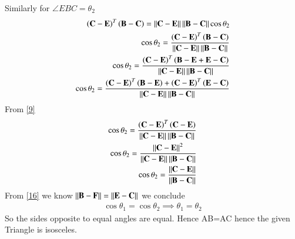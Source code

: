 \documentclass[journal,12pt,twocolumn]{IEEEtran}
\begin{document}
        Similarly for $\angle EBC=\theta_2$
       \begin{align}
        \left(\mathbf{C}-\mathbf{E}\right)^T\left(\mathbf{B}-\mathbf{C}\right)=\left\lVert\mathbf{C}-\mathbf{E}\right\rVert\left\lVert\mathbf{B}-\mathbf{C}\right\rVert\cos\theta_2\\
        \cos{\theta_2}=\frac{\left(\mathbf{C}-\mathbf{E}\right)^T\left(\mathbf{B}-\mathbf{C}\right)}{\left\lVert\mathbf{C}-\mathbf{E}\right\rVert\left\lVert\mathbf{B}-\mathbf{C}\right\rVert}\\
        \cos{\theta_2}=\frac{\left(\mathbf{C}-\mathbf{E}\right)^T\left(\mathbf{B}-\mathbf{E}+\mathbf{E}-\mathbf{C}\right)}{\left\lVert\mathbf{C}-\mathbf{E}\right\rVert\left\lVert\mathbf{B}-\mathbf{C}\right\rVert}\\
        \cos{\theta_2}=\frac{\left(\mathbf{C}-\mathbf{E}\right)^T\left(\mathbf{B}-\mathbf{E}\right) +\left(\mathbf{C}-\mathbf{E}\right)^T\left(\mathbf{E}-\mathbf{C}\right)}{\left\lVert\mathbf{C}-\mathbf{E}\right\rVert\left\lVert\mathbf{B}-\mathbf{C}\right\rVert}
        \end{align}
        From {\eqref{9}}
        \begin{align}
          \cos{\theta_2}=\frac{\left(\mathbf{C}-\mathbf{E}\right)^T\left(\mathbf{C}-\mathbf{E}\right)}{\left\lVert\mathbf{C}-\mathbf{E}\right\rVert\left\lVert\mathbf{B}-\mathbf{C}\right\rVert} \\
          \cos{\theta_2}=\frac{\left\lVert\mathbf{C}-\mathbf{E}\right\rVert^2}{\left\lVert\mathbf{C}-\mathbf{E}\right\rVert\left\lVert\mathbf{B}-\mathbf{C}\right\rVert}\\
          \cos{\theta_2}=\frac{\left\lVert\mathbf{C}-\mathbf{E}\right\rVert}{\left\lVert\mathbf{B}-\mathbf{C}\right\rVert}
        \end{align}
        From \eqref{16} we know $\left\lVert\mathbf{B}-\mathbf{F}\right\rVert=\left\lVert\mathbf{E}-\mathbf{C}\right\rVert$ we conclude
        \begin{align}
            \cos\theta_1=\cos\theta_2
            \implies\theta_1=\theta_2
        \end{align}
        So the sides opposite to equal angles are equal. Hence AB=AC hence the given Triangle is isosceles.
    
\end{document}
